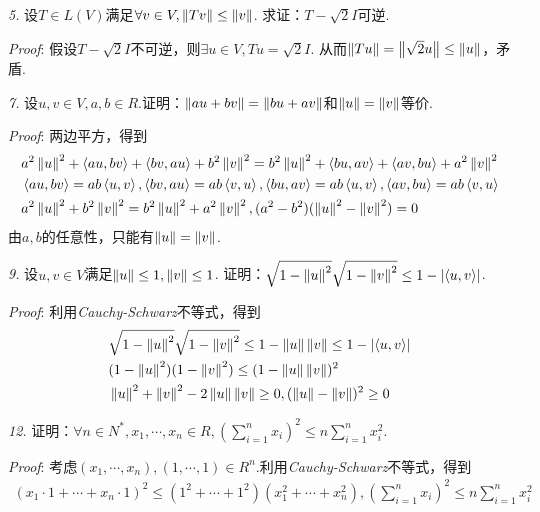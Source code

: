 \textit{5.}
设\(T \in L(V)\)满足\(\forall v \in V,\norm{Tv} \leq \norm{v}\).
求证：\(T-\sqrt{2}I\)可逆.

\textit{Proof}:
假设\(T-\sqrt{2}I\)不可逆，则\(\exists u \in V,Tu=\sqrt{2}I\).
从而\(\norm{Tu}=\norm{\sqrt{2}u} \leq \norm{u}\)，矛盾.

\hspace*{\fill}

\textit{7.}
设\(u,v \in V,a,b \in R\).证明：\(\norm{au+bv}=\norm{bu+av}\)和\(\norm{u}=\norm{v}\)等价.

\textit{Proof}:
两边平方，得到
    \begin{align*}
        &a^2\norm{u}^2+\ip{au}{bv}+\ip{bv}{au}+b^2\norm{v}^2=b^2\norm{u}^2+\ip{bu}{av}+\ip{av}{bu}+a^2\norm{v}^2 \\
        &\ip{au}{bv}=ab\ip{u}{v},\ip{bv}{au}=ab\ip{v}{u},\ip{bu}{av}=ab\ip{u}{v},\ip{av}{bu}=ab\ip{v}{u} \\
        &a^2\norm{u}^2+b^2\norm{v}^2=b^2\norm{u}^2+a^2\norm{v}^2,(a^2-b^2)(\norm{u}^2-\norm{v}^2)=0
    \end{align*}
由\(a,b\)的任意性，只能有\(\norm{u}=\norm{v}\).

\hspace*{\fill}

\textit{9.}
设\(u,v \in V\)满足\(\norm{u} \leq 1,\norm{v} \leq 1\).
证明：\(\sqrt{1-\norm{u}^2}\sqrt{1-\norm{v}^2} \leq 1-\abs{\ip{u}{v}}\).

\textit{Proof}:
利用\textit{Cauchy-Schwarz}不等式，得到
    \begin{align*}
        &\sqrt{1-\norm{u}^2}\sqrt{1-\norm{v}^2} \leq 1-\norm{u}\norm{v} \leq 1-\abs{\ip{u}{v}} \\
        &(1-\norm{u}^2)(1-\norm{v}^2) \leq (1-\norm{u}\norm{v})^2 \\
        &\norm{u}^2+\norm{v}^2-2\norm{u}\norm{v} \geq 0,(\norm{u}-\norm{v})^2 \geq 0
    \end{align*}

\hspace*{\fill}

\textit{12.}
证明：\(\forall n \in N^*,x_1,\cdots,x_n \in R,(\sum_{i=1}^n x_i)^2 \leq n\sum_{i=1}^n x_i^2\).

\textit{Proof}:
考虑\((x_1,\cdots,x_n),(1,\cdots,1) \in R^n\).利用\textit{Cauchy-Schwarz}不等式，得到
    \begin{align*}
        (x_1 \cdot 1+\cdots+x_n \cdot 1)^2 \leq (1^2+\cdots+1^2)(x_1^2+\cdots+x_n^2),
        (\sum_{i=1}^n x_i)^2 \leq n\sum_{i=1}^n x_i^2
    \end{align*}

